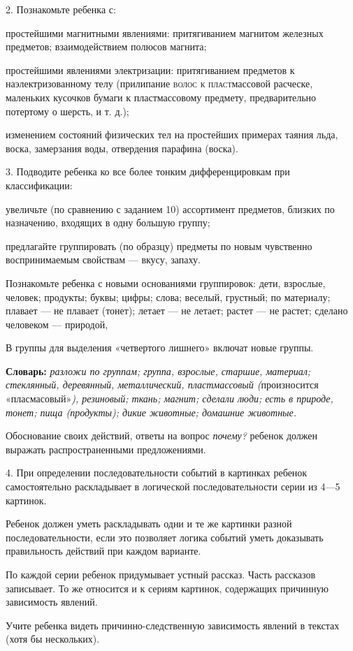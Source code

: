 \documentclass[a5paper]{book}
\renewcommand{\emph}[1]{\textit{#1}}
\begin{document}
2. Познакомьте ребенка с:

простейшими магнитными явлениями: притягиванием магнитом железных
предметов; взаимодействием полюсов магнита;

простейшими явлениями электризации: притягиванием предметов к
наэлектризованному телу (прилипание \textsc{волос к пласт}массовой
расческе, маленьких кусочков бумаги к пластмассовому предмету,
предварительно потертому о шерсть, и т. д.);

изменением состояний физических тел на простейших примерах таяния льда,
воска, замерзания воды, отвердения парафина (воска).

3. Подводите ребенка ко все более тонким дифференцировкам при
классификации:

увеличьте (по сравнению с заданием 10) ассортимент предметов, близких по
назначению, входящих в одну большую группу;

предлагайте группировать (по образцу) предметы по новым чувственно
воспринимаемым свойствам --- вкусу, запаху.

Познакомьте ребенка с новыми основаниями группировок: дети, взрослые,
человек; продукты; буквы; цифры; слова; веселый, грустный; по материалу;
плавает --- не плавает (тонет); летает --- не летает; растет --- не
растет; сделано человеком --- природой,

В группы для выделения «четвертого лишнего» включат новые группы.

\textbf{Словарь:} \emph{разложи по группам; группа, взрослые, старшие,
материал; стеклянный, деревянный, металлический, пластмассовый
(}произносится «пласмасовый»\emph{), резиновый; ткань; магнит; сделали
люди; есть в природе, тонет; пища (продукты); дикие животные; домашние
животные.}

Обоснование своих действий, ответы на вопрос \emph{почему?} ребенок
должен выражать распространенными предложениями.

4. При определении последовательности событий в картинках ребенок
самостоятельно раскладывает в логической последовательности серии из
4---5 картинок.

Ребенок должен уметь раскладывать одни и те же картинки разной
последовательности, если это позволяет логика событий уметь доказывать
правильность действий при каждом варианте.

По каждой серии ребенок придумывает устный рассказ. Часть рассказов
записывает. То же относится и к сериям картинок, содержащих причинную
зависимость явлений.

Учите ребенка видеть причинно-следственную зависимость явлений в текстах
(хотя бы нескольких).
\end{document}
